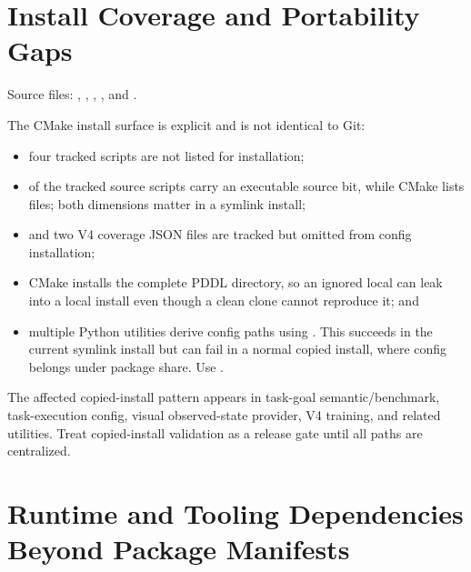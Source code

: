 \section{Install Coverage and Portability Gaps}

Source files: ,
,
,
, and
.

The CMake install surface is explicit and is not identical to Git:

\begin{itemize}
  \item four tracked scripts are not listed for installation;
  \item \RepositoryExecutableSourceScriptCount{} of the
        \RepositoryScriptCount{} tracked source scripts carry an executable
        source bit, while CMake lists \RepositoryInstalledScriptCount{} files;
        both dimensions matter in a symlink install;
  \item {}
        and two V4 coverage JSON files are
        tracked but omitted from config installation;
  \item CMake installs the complete PDDL directory, so an ignored local
        can leak into a local install even
        though a clean clone cannot reproduce it; and
  \item multiple Python utilities derive config paths using
        . This succeeds in the
        current symlink install but can fail in a normal copied install, where
        config belongs under package share. Use .
\end{itemize}

The affected copied-install pattern appears in task-goal semantic/benchmark,
task-execution config, visual observed-state provider, V4 training, and related
utilities. Treat copied-install validation as a release gate until all paths
are centralized.

\section{Runtime and Tooling Dependencies Beyond Package Manifests}

